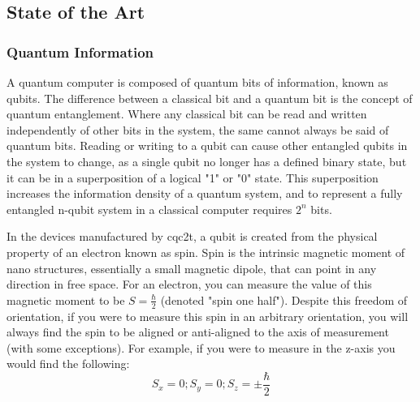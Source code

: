 \subsection{State of the Art}
\subsubsection{Quantum Information}
A quantum computer is composed of quantum bits of information, known as qubits. The difference between a classical bit and a quantum bit is the concept of quantum entanglement. Where any classical bit can be read and written independently of other bits in the system, the same cannot always be said of quantum bits. Reading or writing to a qubit can cause other entangled qubits in the system to change, as a single qubit no longer has a defined binary state, but it can be in a superposition of a logical "1" or "0" state. This superposition increases the information density of a quantum system, and to represent a fully entangled n-qubit system in a classical computer requires $2^n$ bits. \cite{bennett2000quantum}

In the devices manufactured by \gls{cqc2t}, a qubit is created from the physical property of an electron known as spin. Spin is the intrinsic magnetic moment of nano structures, essentially a small magnetic dipole, that can point in any direction in free space. For an electron, you can measure the value of this magnetic moment to be $S = \frac{\hbar}{2}$ (denoted "spin one half"). Despite this freedom of orientation, if you were to measure this spin in an arbitrary orientation, you will always find the spin to be aligned or anti-aligned to the axis of measurement (with some exceptions). For example, if you were to measure in the z-axis you would find the following:
$$S_x = 0; S_y = 0; S_z = \pm\frac{\hbar}{2}$$

